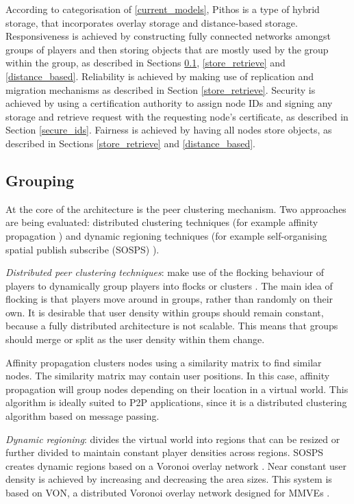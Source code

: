 According to categorisation of \ref{current_models}, Pithos is a type of hybrid storage, that incorporates overlay storage and distance-based
storage. Responsiveness is achieved by constructing fully connected networks amongst groups of players and then storing objects that are mostly used
by the group within the group, as described in Sections \ref{grouping}, \ref{store_retrieve} and \ref{distance_based}. Reliability is achieved by
making use of replication and migration mechanisms as described in Section \ref{store_retrieve}. Security is achieved by using a certification
authority to assign node IDs and signing any storage and retrieve request with the requesting node's certificate, as described in Section
\ref{secure_ids}. Fairness is achieved by having all nodes store objects, as described in Sections \ref{store_retrieve} and \ref{distance_based}.

\subsection{Grouping}
\label{grouping}

At the core of the architecture is the peer clustering mechanism. Two approaches are being evaluated: distributed clustering techniques (for example
affinity propagation \cite{affinity_propagation}) and dynamic regioning techniques (for example self-organising spatial publish subscribe (SOSPS)
\cite{self_organising_sps_post}).

\emph{Distributed peer clustering techniques}: make use of the flocking behaviour of players to dynamically group players into flocks or clusters
\cite{flocking}. The main idea of flocking is that players move around in groups, rather than randomly on their own. It is desirable that user
density within groups should remain constant, because a fully distributed architecture is not scalable. This means that groups should merge or split
as the user density within them change.

Affinity propagation clusters nodes using a similarity matrix to find similar nodes. The similarity matrix may contain user positions. In this case,
affinity propagation will group nodes depending on their location in a virtual world. This algorithm is ideally suited to P2P applications, since it
is a distributed clustering algorithm based on message passing.

\emph{Dynamic regioning}: divides the virtual world into regions that can be resized or further divided to maintain constant player densities across
regions. SOSPS creates dynamic regions based on a Voronoi overlay network \cite{voronoi_diagrams_survey}. Near constant user density is achieved by
increasing and decreasing the area sizes. This system is based on VON, a distributed Voronoi overlay network designed for MMVEs \cite{VON_VAST}.


